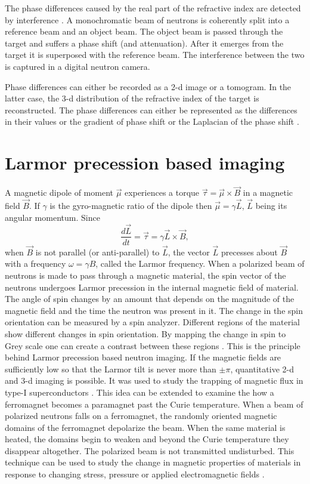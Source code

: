 \documentclass{article}
\numberwithin{equation}{section}
\begin{document}
The phase differences caused by the real part of the refractive index are
detected by interference \cite{zawisky2004neutron}. A monochromatic beam of
neutrons is coherently split into a reference beam and an object beam. The 
object beam is passed through the target and suffers a phase shift (and 
attenuation). After it emerges from the target it is superposed with the 
reference beam. The interference between the two is captured in a digital
neutron camera.

Phase differences can either be recorded as a 2-d image or a tomogram. In the
latter case, the 3-d distribution of the refractive index of the target is 
reconstructed. The phase differences can either be represented as the 
differences in their values or the gradient of phase shift or the Laplacian of
the phase shift \cite{anderson2008neutron}.

\section{Larmor precession based imaging}\label{s11}
A magnetic dipole of moment $\vec{\mu}$ experiences a torque $\vec{\tau} = 
\vec{\mu} \times \vec{B}$ in a magnetic field $\vec{B}$. If $\gamma$ is the
gyro-magnetic ratio of the dipole then $\vec{\mu} = \gamma\vec{L}$, $\vec{L}$
being its angular momentum. Since
\begin{equation}\label{s11e1}
\frac{d\vec{L}}{dt} = \vec{\tau} = \gamma\vec{L} \times \vec{B},
\end{equation}
when $\vec{B}$ is not parallel (or anti-parallel) to $\vec{L}$, the vector 
$\vec{L}$ precesses about $\vec{B}$ with a frequency $\omega = \gamma B$, 
called the Larmor frequency. When a polarized beam of neutrons is made to
pass through a magnetic material, the spin vector of the neutrons undergoes
Larmor precession in the internal magnetic field of material. The angle of 
spin changes by an amount that depends on the magnitude of the magnetic field
and the time the neutron was present in it. The change in the spin orientation
can be measured by a spin analyzer. Different regions of the material show
different changes in spin orientation. By mapping the change in spin to Grey
scale one can create a contrast between these regions 
\cite{kardjilov2011neutron}. This is the principle behind Larmor precession
based neutron imaging. If the magnetic fields are sufficiently low so that
the Larmor tilt is never more than $\pm\pi$, quantitative 2-d and 3-d imaging
is possible. It was used to study the trapping of magnetic flux in type-I 
superconductors \cite{kardjilov2008three}. This idea can be extended to 
examine the how a ferromagnet becomes a paramagnet past the Curie temperature.
When a beam of polarized neutrons falls on a ferromagnet, the randomly oriented
magnetic domains of the ferromagnet depolarize the beam. When the same material
is heated, the domains begin to weaken and beyond the Curie temperature they
disappear altogether. The polarized beam is not transmitted undisturbed. This
technique can be used to study the change in magnetic properties of materials
in response to changing stress, pressure or applied electromagnetic fields
\cite{kardjilov2011neutron}.
\end{document}
